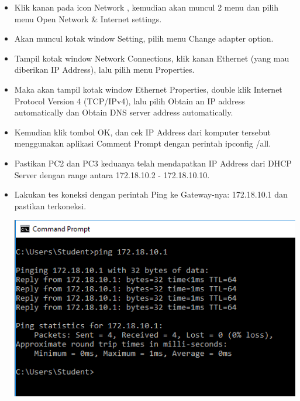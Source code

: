 \documentclass[a4paper,12pt]{article}
\begin{document}
\begin{enumerate}[label=\textbf{\arabic*.}]
\begin{center}
        \end{center}
        \begin{itemize}
            \item Klik kanan pada icon Network , kemudian akan muncul 2 menu dan pilih menu Open Network \& Internet settings.  
            \item Akan muncul kotak window Setting, pilih menu Change adapter option.
            \item Tampil kotak window Network Connections, klik kanan Ethernet (yang mau diberikan IP Address), lalu pilih menu Properties.
            \item Maka akan tampil kotak window Ethernet Properties, double klik Internet Protocol Version 4 (TCP/IPv4), lalu pilih Obtain an IP address automatically dan Obtain DNS server address automatically.
            \item Kemudian klik tombol OK, dan cek IP Address dari komputer tersebut menggunakan aplikasi Comment Prompt dengan perintah ipconfig /all.
            \item Pastikan PC2 dan PC3 keduanya telah mendapatkan IP Address dari DHCP Server dengan range antara 172.18.10.2 - 172.18.10.10.
            \item Lakukan tes koneksi dengan perintah Ping ke Gateway-nya: 172.18.10.1 dan pastikan terkoneksi.
                \begin{center}
                    \includegraphics[width=0.8\linewidth]{image9.png}
                \end{center}
        \end{itemize}


\end{enumerate}
\end{document}
